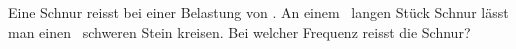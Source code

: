 Eine Schnur reisst bei einer Belastung von \FSnO. An einem \rSnO\ langen Stück Schnur lässt man einen \mSnO\ schweren Stein kreisen. Bei welcher Frequenz reisst die Schnur?
